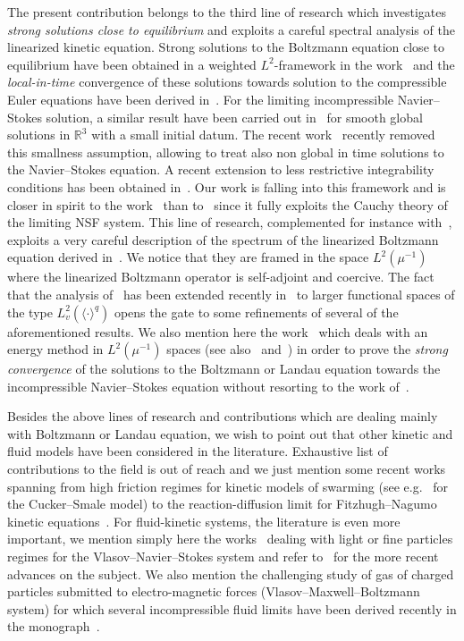 \documentclass[AHL,Unicode,longabstracts,published]{cedram}
\newcommand{\R}{\mathbb{R}}
\begin{document}
The present contribution belongs to the third line of research which investigates \emph{strong solutions close to equilibrium} and exploits a careful spectral analysis of the linearized kinetic equation. Strong solutions to the Boltzmann equation close to equilibrium have been obtained in a weighted $L^{2}$-framework in the work~\cite{U1974} and the \emph{local-in-time} convergence of these solutions towards solution to the compressible Euler equations have been derived in~\cite{nishida}. For the limiting incompressible Navier--Stokes solution, a similar result have been carried out in~\cite{BU1991} for smooth global solutions in $\R^{3}$ with a small {initial datum}. The recent work~\cite{GT2020} recently removed this smallness assumption, allowing to treat also non global in time solutions to the Navier--Stokes equation. A recent extension to less restrictive integrability conditions has been obtained in~\cite{G2023}. Our work is falling into this framework and is closer in spirit to the work~\cite{GT2020} than to~\cite{BU1991} since it fully exploits the Cauchy theory of the limiting NSF system. This line of research, complemented for instance with~\cite{B2015,BMM2019, CC2023}, exploits a very careful description of the spectrum of the linearized Boltzmann equation derived in~\cite{EP1975}. We notice that they are framed in the space $L^{2}(\mu^{-1})$ where the linearized Boltzmann operator is self-adjoint and coercive. The fact that the analysis of~\cite{EP1975} has been extended recently in~\cite{G2021} to larger functional spaces of the type $L^{2}_{v}(\langle \cdot\rangle^{q})$ opens the gate to some refinements of several of the aforementioned results. We also mention here the work~\cite{zhao} which deals with an energy method in $L^{2}(\mu^{-1})$ spaces (see also~\cite{guo,guo2} and~\cite{R2021}) in order to prove the \emph{strong convergence} of the solutions to the Boltzmann or Landau equation towards the incompressible Navier--Stokes equation without resorting to the work of~\cite{EP1975}.

Besides the above lines of research and contributions which are dealing mainly with Boltzmann or Landau equation, we wish to point out that other kinetic and fluid models have been considered in the literature. Exhaustive list of contributions to the field is out of reach and we just mention some recent works spanning from high friction regimes for kinetic models of swarming (see e.g.~\cite{figalli,karper} for the Cucker--Smale model) to the reaction-diffusion limit for Fitzhugh--Nagumo kinetic equations~\cite{crevat}. For fluid-kinetic systems, the literature is even more important, we mention simply here the works~\cite{goudona,goudonb} dealing with light or fine particles regimes for the Vlasov--Navier--Stokes system and refer to~\cite{daniel} for the more recent advances on the subject. We also mention the challenging study of gas of charged particles submitted to electro-magnetic forces (Vlasov--Maxwell--Boltzmann system) for which several incompressible fluid limits have been derived recently in the monograph~\cite{arsenio}.
\end{document}
